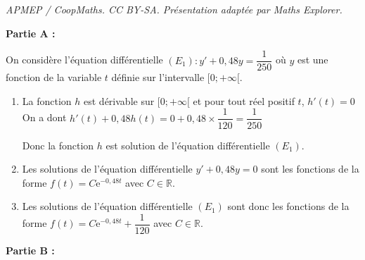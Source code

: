 \documentclass[10pt]{article}
\providecommand{\R}{\mathbb{R}}
\providecommand{\e}{{\mathrm{e}}}
\begin{document}
\noindent\textit{APMEP / CoopMaths. CC BY-SA. Présentation adaptée par Maths Explorer.}\par\medskip
\medskip

\textbf{Partie A : }
\medskip

On considère l'équation différentielle $\left(E_{1}\right): y'+0,48 y=\dfrac{1}{250}$ où $y$ est une fonction de la variable $t$ définie sur l'intervalle $[0 ;+\infty[$.

\begin{enumerate}
\item La fonction $h$ est dérivable  sur $[0 ;+\infty[$ et pour  tout réel positif $t$, $h'(t)=0$ 
On a dont $h'(t) +0,48 h(t) =0 + 0,48 \times \dfrac{1}{120}= \dfrac{1}{250}$ 

Donc  la fonction $h$ est solution de l'équation différentielle $\left(E_{1}\right)$.
\item Les solutions de l'équation différentielle $y'+0,48 y=0$ sont les fonctions de la forme $f(t) =C \e^{-0,48t}$ avec $C \in \R$. 
\item Les solutions de l'équation différentielle $\left(E_{1}\right)$ sont donc les fonctions de la forme $f(t) =C \e^{-0,48t} + \dfrac{1}{120}$ avec $C \in \R$.
\end{enumerate}
\medskip

\textbf{Partie B :}
\medskip
\end{document}
